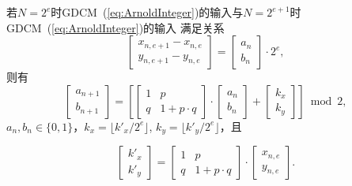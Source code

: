 \begin{Property}
若$N=2^e$时GDCM~(\ref{eq:ArnoldInteger})的输入与$N=2^{e+1}$时GDCM~(\ref{eq:ArnoldInteger})的输入
满足关系
\begin{equation}
\begin{bmatrix}
		x_{n, e+1}-x_{n, e} \\
		y_{n, e+1}-y_{n, e}
	\end{bmatrix}
=
\begin{bmatrix}
		a_n \\
		b_n
	\end{bmatrix} \cdot 2^e,
\label{eq:condition}
\end{equation}
则有
\begin{equation}
	\begin{bmatrix}
		a_{n+1}\\
		b_{n+1}
	\end{bmatrix}
	=
	\left[\begin{bmatrix}
		1 & p    \\
		q & 1+p\cdot q
	\end{bmatrix}\cdot
	\begin{bmatrix}
		a_n  \\
		b_n
	\end{bmatrix}+
	\begin{bmatrix}
		k_x \\
		k_y
	\end{bmatrix}\right] \bmod 2,
		\label{eq:kxky}
\end{equation}
$a_n, b_n\in \{0, 1\}$，$k_x=\lfloor k'_x/2^e\rfloor$, $k_y=\lfloor k'_y/2^e\rfloor$，且

\begin{equation}
	\begin{bmatrix}
		k'_x \\
		k'_y
	\end{bmatrix}
	=
	\begin{bmatrix}
		1 & p    \\
		q & 1+p\cdot q
	\end{bmatrix}\cdot
	\begin{bmatrix}
		x_{n, e} \\
		y_{n, e}
	\end{bmatrix}.
\label{eq:k2xk2y}
\end{equation}
\label{Property:evolution}
\end{Property}
\setlength{\arraycolsep}{2pt}
